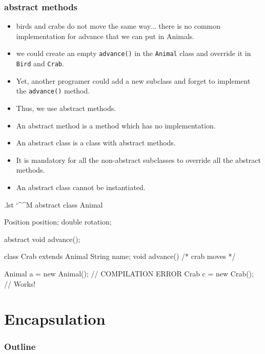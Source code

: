 \documentclass[10pt, handout]{beamer}
\makeatletter
\newenvironment{code}{%
  \begingroup
  \@bsphack
  \immediate\openout\lstvrb@out\jobname.lst
  \let\do\@makeother\dospecials\catcode`\^^M\active
  \def\verbatim@processline{%
    \immediate\write\lstvrb@out{\the\verbatim@line}}%
  \verbatim@start}{%
  \immediate\closeout\lstvrb@out
  \@esphack
  \endgroup
  
  \begin{alertblock}{}
    
  \end{alertblock}}
\makeatother
\begin{document}
\begin{frame}[fragile]
  \frametitle{abstract methods}


  \begin{itemize}
    \item birds and crabs do not move the same way... there is no common implementation for advance that we can put in Animals.
    \item we could create an empty \verb!advance()! in the \verb!Animal! class and override it in \verb!Bird! and \verb!Crab!.
    \item Yet, another programer could add a new subclass and forget to implement the \verb!advance()! method.
    \item Thus, we use \alert{abstract methods}.
  \end{itemize}

  \begin{definition}
    \begin{itemize}
      \item An abstract method is a method which has no implementation. 
      \item An abstract class is a class with abstract methods.
      \item It is mandatory for all the non-abstract subclasses to override all the abstract methods.
      \item An abstract class cannot be instantiated.
    \end{itemize}
 \end{definition}
\end{frame}

\begin{frame}
  \begin{code}
abstract class Animal {
  Position position;
  double rotation;

  abstract void advance();    
 
}

class Crab extends Animal{
  String name;
  void advance() {
    /* crab moves */
  }
}

Animal a = new Animal(); // COMPILATION ERROR
Crab   c = new Crab();   // Works!
\end{code}
\end{frame}

\section{Encapsulation}
\begin{frame}
  \frametitle{Outline}
  \tableofcontents[currentsection]
\end{frame}
\end{document}
